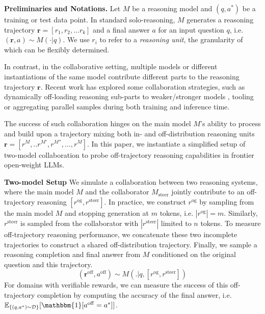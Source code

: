 \documentclass{article} %
\begin{document}
\textbf{Preliminaries and Notations.} Let $M$ be a reasoning model and $(q, a^{*})$ be a training or test data point. In standard solo-reasoning, $M$ generates a reasoning trajectory $\mathbf{r} = [r_1, r_2, ... r_k]$ and a final answer $a$ for an input question $q$, i.e. $(\mathbf{r}, a) \sim M(\cdot|q)$. We use $r_i$ to refer to a \textit{reasoning unit}, the granularity of which can be flexibly determined. 

In contrast, in the collaborative setting, multiple models or different instantiations of the same model contribute different parts to the reasoning trajectory $\mathbf{r}$. Recent work has explored some collaboration strategies, such as dynamically off-loading reasoning sub-parts to weaker/stronger models \citep{yan2025learning, zhou2025expo,akhauri2025splitreason}, tooling \citep{jin2025search} or aggregating parallel samples \citep{zhao2025majority, qi2025learning} during both training and inference time.


The success of such collaboration hinges on the main model $M$'s ability to process and build upon a trajectory mixing both in- and off-distribution reasoning units $\mathbf{r} = [r^{M}, .. r^{M'}, r^{M''},\ldots, r^{M}]$.  In this paper, we instantiate a simplified setup of two-model collaboration to probe off-trajectory reasoning capabilities in frontier open-weight LLMs.

\textbf{Two-model Setup} We simulate a collaboration between two reasoning systems, where the main model $M$ and the collaborator $M_\mathrm{steer}$ jointly contribute to an off-trajectory reasoning $[r^\mathrm{og}, r^\mathrm{steer}]$. In practice, we construct $r^\mathrm{og}$ by sampling from the main model $M$ and stopping generation at $m$ tokens, i.e. $|r^\mathrm{og}| = m$. Similarly, $r^\mathrm{steer}$ is sampled from the collaborator with $|r^\mathrm{steer}| $ limited to $ n$ tokens. To measure off-trajectory reasoning performance, we concatenate these two incomplete trajectories to construct a shared off-distribution trajectory. Finally, we sample a reasoning completion and final answer from $M$ conditioned on the original question and this trajectory.
\begin{equation*}
    (\mathbf{r}^\mathrm{off}, a^\mathrm{off}) \sim M(. | q,  [r^\mathrm{og}, r^\mathrm{steer}])
\end{equation*} 
For domains with verifiable rewards, we can measure the success of this off-trajectory completion by computing the accuracy of the final answer, i.e. $\mathbb{E}_{\{(q, a^{*}) \sim \mathcal{D} \}}[\mathbbm{1}[a^\mathrm{off} =a^*]]$. 
\end{document}

